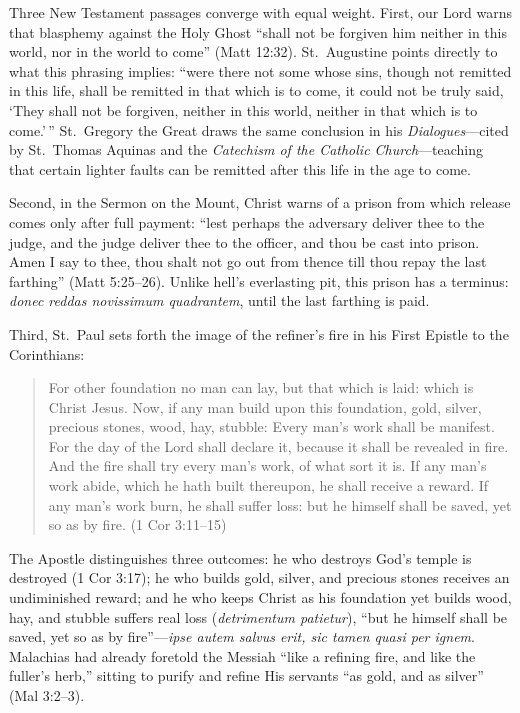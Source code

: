 Three New Testament passages converge with equal weight. First, our Lord warns that blasphemy against the Holy Ghost ``shall not be forgiven him neither in this world, nor in the world to come'' (Matt 12:32). St.\ Augustine points directly to what this phrasing implies: ``were there not some whose sins, though not remitted in this life, shall be remitted in that which is to come, it could not be truly said, `They shall not be forgiven, neither in this world, neither in that which is to come.'\,'' St.\ Gregory the Great draws the same conclusion in his \textit{Dialogues}---cited by St.\ Thomas Aquinas and the \textit{Catechism of the Catholic Church}---teaching that certain lighter faults can be remitted after this life in the age to come.

Second, in the Sermon on the Mount, Christ warns of a prison from which release comes only after full payment: ``lest perhaps the adversary deliver thee to the judge, and the judge deliver thee to the officer, and thou be cast into prison. Amen I say to thee, thou shalt not go out from thence till thou repay the last farthing'' (Matt 5:25--26). Unlike hell's everlasting pit, this prison has a terminus: \textit{donec reddas novissimum quadrantem}, until the last farthing is paid.

Third, St.\ Paul sets forth the image of the refiner's fire in his First Epistle to the Corinthians:

\begin{quote}
For other foundation no man can lay, but that which is laid: which is Christ Jesus. Now, if any man build upon this foundation, gold, silver, precious stones, wood, hay, stubble: Every man's work shall be manifest. For the day of the Lord shall declare it, because it shall be revealed in fire. And the fire shall try every man's work, of what sort it is. If any man's work abide, which he hath built thereupon, he shall receive a reward. If any man's work burn, he shall suffer loss: but he himself shall be saved, yet so as by fire. (1 Cor 3:11--15)
\end{quote}

The Apostle distinguishes three outcomes: he who destroys God's temple is destroyed (1 Cor 3:17); he who builds gold, silver, and precious stones receives an undiminished reward; and he who keeps Christ as his foundation yet builds wood, hay, and stubble suffers real loss (\textit{detrimentum patietur}), ``but he himself shall be saved, yet so as by fire''---\textit{ipse autem salvus erit, sic tamen quasi per ignem}. Malachias had already foretold the Messiah ``like a refining fire, and like the fuller's herb,'' sitting to purify and refine His servants ``as gold, and as silver'' (Mal 3:2--3).

